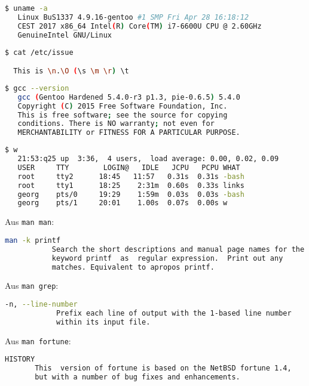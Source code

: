 \documentclass[a4paper,twoside,subproblemsty=arabic,subsubproblemsty=alph, listings]{homeworkassignment}
\author{Max Mustermann Matr.Nr. 1701 \\ Autor Zwei Matr.Nr. 4711 \\ Dritter Kollaborateur Matr.Nr. 4242 }
\date{\today}
\begin{document}
\maketitle
\makeGradingTable
\newproblem[1]
\newproblem*[3]
\newproblem[2]

\newsubproblem[1]
\newsubsubproblem
\begin{lstlisting}[language=bash]
  $ uname -a
   Linux BuS1337 4.9.16-gentoo #1 SMP Fri Apr 28 16:18:12
   CEST 2017 x86_64 Intel(R) Core(TM) i7-6600U CPU @ 2.60GHz
   GenuineIntel GNU/Linux  
\end{lstlisting}

\begin{lstlisting}[language=bash]
  $ cat /etc/issue

  This is \n.\O (\s \m \r) \t
\end{lstlisting}
\begin{lstlisting}[language=bash]
  $ gcc --version
   gcc (Gentoo Hardened 5.4.0-r3 p1.3, pie-0.6.5) 5.4.0
   Copyright (C) 2015 Free Software Foundation, Inc.
   This is free software; see the source for copying
   conditions. There is NO warranty; not even for
   MERCHANTABILITY or FITNESS FOR A PARTICULAR PURPOSE.
\end{lstlisting}

\begin{lstlisting}[language=bash]
  $ w
   21:53:q25 up  3:36,  4 users,  load average: 0.00, 0.02, 0.09
   USER     TTY        LOGIN@   IDLE   JCPU   PCPU WHAT
   root     tty2      18:45   11:57   0.31s  0.31s -bash
   root     tty1      18:25    2:31m  0.60s  0.33s links
   georg    pts/0     19:29    1:59m  0.03s  0.03s -bash
   georg    pts/1     20:01    1.00s  0.07s  0.00s w
\end{lstlisting}
\newsubsubproblem

Aus \texttt{man man}:
\begin{lstlisting}[language=bash]
  man -k printf
           Search the short descriptions and manual page names for the
           keyword printf  as  regular expression.  Print out any
           matches. Equivalent to apropos printf.
\end{lstlisting}

Aus \texttt{man grep}:
\begin{lstlisting}[language=bash]
  -n, --line-number
            Prefix each line of output with the 1-based line number
            within its input file.
\end{lstlisting}

Aus \texttt{man fortune}:
\begin{lstlisting}[language=bash]
  HISTORY
       This  version of fortune is based on the NetBSD fortune 1.4,
       but with a number of bug fixes and enhancements.
\end{lstlisting}
\end{document}
